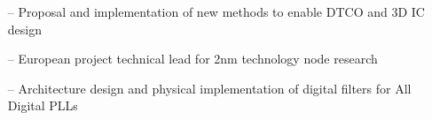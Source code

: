 \documentclass[10pt,a4paper,fancychapters]{altacv}
\begin{document}


\begin{itemize}
    \setlength{\itemindent}{0.5em}
    \item[--] \small{Proposal and implementation of new methods to enable DTCO and 3D IC design}
    \item[--] \small{European project technical lead for 2nm technology node research}
\end{itemize}




\begin{itemize}
    \setlength{\itemindent}{0.5em}
    \item[--]  \small {Architecture design and physical implementation of digital filters for All Digital PLLs}
    
\end{itemize}
\end{document}
